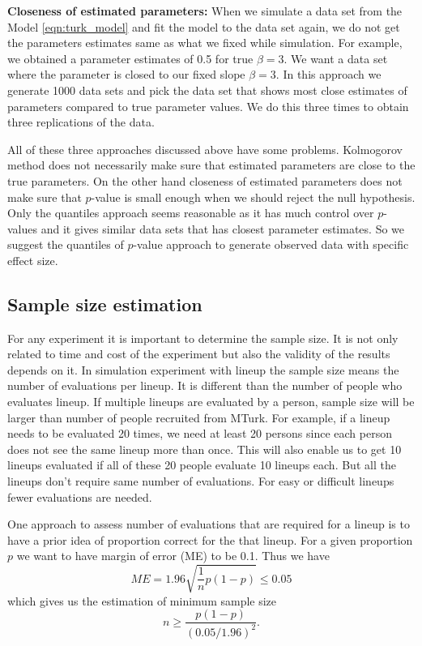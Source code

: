 \documentclass[11pt]{article}
\begin{document}
{\bf Closeness of estimated parameters:} When we simulate a data set from the Model \eqref{eqn:turk_model} and fit the model to the data set again, we do not get the parameters estimates same as what we fixed while simulation. For example, we obtained a parameter estimates of 0.5 for true $\beta=3$. We want a data set where the parameter is closed to our fixed slope $\beta=3$.  In this approach we generate 1000 data sets and pick the data set that shows most close estimates of parameters compared to true parameter values. We do this three times to obtain three replications of the data.

All of these three approaches discussed above have some problems. Kolmogorov method does not necessarily make sure that estimated parameters are close to the true parameters. On the other hand closeness of estimated parameters does not make sure that $p$-value is small enough when we should reject the null hypothesis. Only the quantiles approach seems reasonable as it has much control over $p$-values and it gives similar data sets that has closest parameter estimates. So we suggest the quantiles of $p$-value approach to generate observed data with specific effect size.

\subsection{Sample size estimation} For any experiment it is important to determine the sample size. It is not only related to time and cost of the experiment but also the validity of the results depends on it. In simulation experiment with lineup the sample size means the number of evaluations per lineup. It is different than the number of people who evaluates lineup. If multiple lineups are evaluated by a person, sample size will be larger than number of people recruited from MTurk. For example, if a lineup needs to be evaluated 20 times, we need at least 20 persons since each person does not see the same lineup more than once. This will also enable us to get 10 lineups evaluated if all of these 20 people evaluate 10 lineups each. But all the lineups don't require same number of evaluations. For easy or difficult lineups fewer evaluations are needed.

One approach to assess number of evaluations that are required for a lineup is to have a prior idea of proportion correct for the that lineup. For a given proportion $p$ we want to have margin of error (ME) to be 0.1. Thus we have $$ME =1.96 \sqrt{ \frac 1 n p(1-p)} \le 0.05$$ which gives us the estimation of minimum sample size $$n \geq \frac{p(1-p)}{(0.05/1.96)^2}.$$ 
\end{document}
